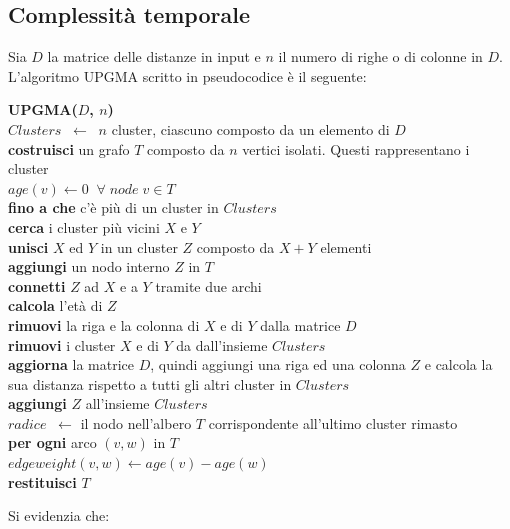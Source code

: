 \subsection{Complessità temporale}
Sia $D$ la matrice delle distanze in input e $n$ il numero di righe o di colonne in $D$. L'algoritmo UPGMA scritto in pseudocodice è il seguente:
\begin{framed}\noindent
  \textbf{UPGMA($D$, $n$)}\\
   $Clusters \;\; \leftarrow \;\; n$ cluster, ciascuno composto da un elemento di $D$ \\
  \textbf{costruisci} un grafo $T$ composto da $n$ vertici isolati. Questi rappresentano i cluster \\
  $age(v)\leftarrow 0 \;\; \forall \; node \; v \in T$\\
  \textbf{fino a che} c'è più di un cluster in $Clusters$ \\
  \indent \textbf{cerca} i cluster più vicini $X$ e $Y$\\
  \indent \textbf{unisci} $X$ ed $Y$ in un cluster $Z$ composto da $X+Y$ elementi\\
  \indent \textbf{aggiungi} un nodo interno $Z$ in $T$\\
  \indent \textbf{connetti} $Z$ ad $X$ e a $Y$ tramite due archi \\
  \indent \textbf{calcola} l'età di $Z$\\
  \indent \textbf{rimuovi} la riga e la colonna di $X$ e di $Y$ dalla matrice $D$ \\
  \indent \textbf{rimuovi} i cluster $X$ e di $Y$  da dall'insieme $Clusters$ \\
  \indent \textbf{aggiorna} la matrice $D$, quindi aggiungi una riga ed una colonna $Z$ \indent e calcola la sua distanza rispetto a tutti gli altri cluster in $Clusters$ \\
  \indent \textbf{aggiungi} $Z$ all'insieme $Clusters$ \\
  $radice \;\; \leftarrow $ il nodo nell'albero $T$ corrispondente all'ultimo cluster rimasto \\
  \textbf{per ogni} arco $(v, w)$ in $T$\\
  \indent $edgeweight(v, w) \leftarrow age(v) - age(w) $\\
  \textbf{restituisci} $T$
\end{framed}
Si evidenzia che:
